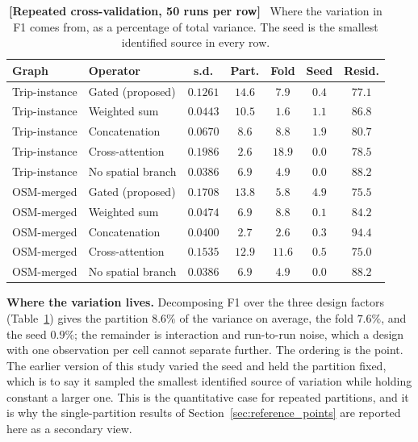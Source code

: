 \documentclass[journal]{IEEEtran}
\begin{document}
\begin{table}[!htbp]
  \centering
  \caption{\textbf{[Repeated cross-validation, 50 runs per row]}~ Where the
  variation in F1 comes from, as a percentage of total variance. The seed is
  the smallest identified source in every row.}
  \label{tab:variance_components}
  \renewcommand{\arraystretch}{1.15}
  \footnotesize
  \setlength{\tabcolsep}{3.5pt}
  \begin{tabular}{@{}llccccc@{}}
    \toprule
    \textbf{Graph} & \textbf{Operator} & \textbf{s.d.} & \textbf{Part.}
    & \textbf{Fold} & \textbf{Seed} & \textbf{Resid.} \\ \midrule
    Trip-instance & Gated (proposed) & $0.1261$ & $14.6$ & $7.9$ & $0.4$ & $77.1$ \\
    Trip-instance & Weighted sum & $0.0443$ & $10.5$ & $1.6$ & $1.1$ & $86.8$ \\
    Trip-instance & Concatenation & $0.0670$ & $8.6$ & $8.8$ & $1.9$ & $80.7$ \\
    Trip-instance & Cross-attention & $0.1986$ & $2.6$ & $18.9$ & $0.0$ & $78.5$ \\
    Trip-instance & No spatial branch & $0.0386$ & $6.9$ & $4.9$ & $0.0$ & $88.2$ \\
    OSM-merged & Gated (proposed) & $0.1708$ & $13.8$ & $5.8$ & $4.9$ & $75.5$ \\
    OSM-merged & Weighted sum & $0.0474$ & $6.9$ & $8.8$ & $0.1$ & $84.2$ \\
    OSM-merged & Concatenation & $0.0400$ & $2.7$ & $2.6$ & $0.3$ & $94.4$ \\
    OSM-merged & Cross-attention & $0.1535$ & $12.9$ & $11.6$ & $0.5$ & $75.0$ \\
    OSM-merged & No spatial branch & $0.0386$ & $6.9$ & $4.9$ & $0.0$ & $88.2$ \\
    \bottomrule
  \end{tabular}
\end{table}

\textbf{Where the variation lives.} Decomposing F1 over the three design
factors (Table~\ref{tab:variance_components}) gives the partition $8.6\%$ of
the variance on average, the fold $7.6\%$, and the seed $0.9\%$; the
remainder is interaction and run-to-run noise, which a design with one
observation per cell cannot separate further. The ordering is the point. The
earlier version of this study varied the seed and held the partition fixed,
which is to say it sampled the smallest identified source of variation while
holding constant a larger one. This is the quantitative case for repeated
partitions, and it is why the single-partition results of
Section~\ref{sec:reference_points} are reported here as a secondary view.
\end{document}
